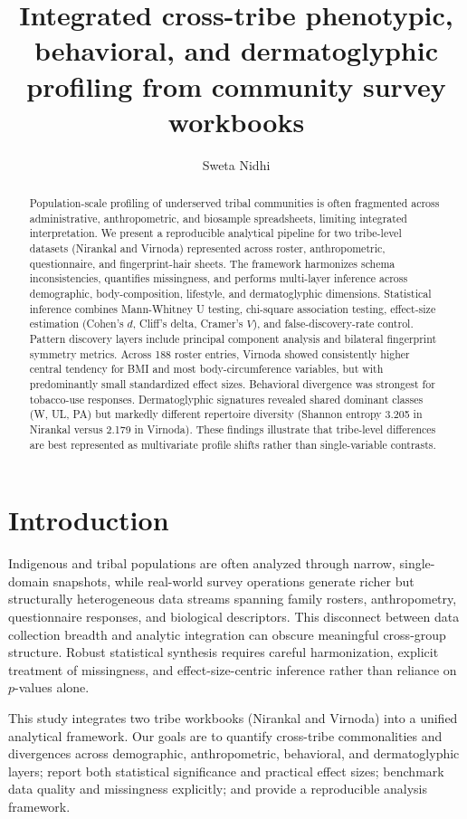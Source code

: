 \documentclass[11pt]{article}
\title{Integrated cross-tribe phenotypic, behavioral, and dermatoglyphic profiling from community survey workbooks}
\author{Sweta Nidhi}
\date{}
\begin{document}
\maketitle

\begin{abstract}
Population-scale profiling of underserved tribal communities is often fragmented across administrative, anthropometric, and biosample spreadsheets, limiting integrated interpretation. We present a reproducible analytical pipeline for two tribe-level datasets (Nirankal and Virnoda) represented across roster, anthropometric, questionnaire, and fingerprint-hair sheets. The framework harmonizes schema inconsistencies, quantifies missingness, and performs multi-layer inference across demographic, body-composition, lifestyle, and dermatoglyphic dimensions. Statistical inference combines Mann-Whitney U testing, chi-square association testing, effect-size estimation (Cohen's $d$, Cliff's delta, Cramer's $V$), and false-discovery-rate control. Pattern discovery layers include principal component analysis and bilateral fingerprint symmetry metrics. Across 188 roster entries, Virnoda showed consistently higher central tendency for BMI and most body-circumference variables, but with predominantly small standardized effect sizes. Behavioral divergence was strongest for tobacco-use responses. Dermatoglyphic signatures revealed shared dominant classes (W, UL, PA) but markedly different repertoire diversity (Shannon entropy 3.205 in Nirankal versus 2.179 in Virnoda). These findings illustrate that tribe-level differences are best represented as multivariate profile shifts rather than single-variable contrasts.
\end{abstract}

\section{Introduction}
Indigenous and tribal populations are often analyzed through narrow, single-domain snapshots, while real-world survey operations generate richer but structurally heterogeneous data streams spanning family rosters, anthropometry, questionnaire responses, and biological descriptors. This disconnect between data collection breadth and analytic integration can obscure meaningful cross-group structure. Robust statistical synthesis requires careful harmonization, explicit treatment of missingness, and effect-size-centric inference rather than reliance on $p$-values alone.

This study integrates two tribe workbooks (Nirankal and Virnoda) into a unified analytical framework. Our goals are to quantify cross-tribe commonalities and divergences across demographic, anthropometric, behavioral, and dermatoglyphic layers; report both statistical significance and practical effect sizes; benchmark data quality and missingness explicitly; and provide a reproducible analysis framework.
\end{document}
